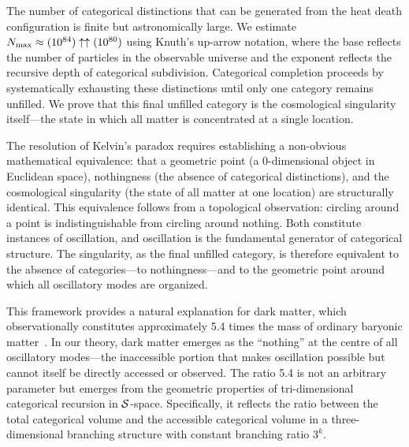 The number of categorical distinctions that can be generated from the heat death configuration is finite but astronomically large. We estimate $N_{\text{max}} \approx (10^{84}) \uparrow\uparrow (10^{80})$ using Knuth's up-arrow notation, where the base reflects the number of particles in the observable universe and the exponent reflects the recursive depth of categorical subdivision. Categorical completion proceeds by systematically exhausting these distinctions until only one category remains unfilled. We prove that this final unfilled category is the cosmological singularity itself—the state in which all matter is concentrated at a single location.

The resolution of Kelvin's paradox requires establishing a non-obvious mathematical equivalence: that a geometric point (a 0-dimensional object in Euclidean space), nothingness (the absence of categorical distinctions), and the cosmological singularity (the state of all matter at one location) are structurally identical. This equivalence follows from a topological observation: circling around a point is indistinguishable from circling around nothing. Both constitute instances of oscillation, and oscillation is the fundamental generator of categorical structure. The singularity, as the final unfilled category, is therefore equivalent to the absence of categories—to nothingness—and to the geometric point around which all oscillatory modes are organized.

This framework provides a natural explanation for dark matter, which observationally constitutes approximately 5.4 times the mass of ordinary baryonic matter~\citep{planck2020}. In our theory, dark matter emerges as the ``nothing'' at the centre of all oscillatory modes—the inaccessible portion that makes oscillation possible but cannot itself be directly accessed or observed. The ratio 5.4 is not an arbitrary parameter but emerges from the geometric properties of tri-dimensional categorical recursion in $\mathcal{S}$-space. Specifically, it reflects the ratio between the total categorical volume and the accessible categorical volume in a three-dimensional branching structure with constant branching ratio $3^k$.

